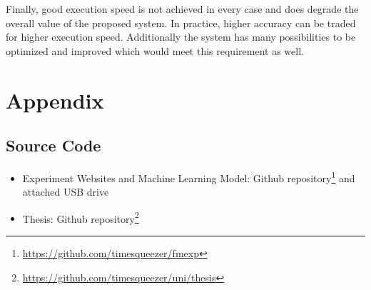 \documentclass[
    fontsize=12pt,
    headings=small,
    parskip=half,           %
    bibliography=totoc,
    numbers=noenddot,       %
    open=any,               %
    final,                   %
    table
]{scrreprt}
\begin{document}
Finally, good execution speed is not achieved in every case and does degrade the overall value of the proposed system. In practice, higher accuracy can be traded for higher execution speed. Additionally the system has many possibilities to be optimized and improved which would meet this requirement as well.

\begin{raggedright}
  \printbibliography
\end{raggedright}

\chapter*{Appendix}

\section*{Source Code}

\begin{itemize}
    \item Experiment Websites and Machine Learning Model: Github repository\footnote{\url{https://github.com/timesqueezer/fmexp}} and attached USB drive
    \item Thesis: Github repository\footnote{\url{https://github.com/timesqueezer/uni/thesis}}
\end{itemize}
\end{document}
